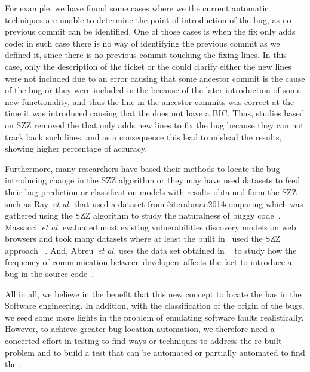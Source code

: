 \documentclass[a4paper, 12pt]{book}
\begin{document}
For example, we have found some cases where we the current automatic techniques are unable to determine the point of introduction of the bug, as no previous commit can be identified. One of those cases is when the fix only adds code: in such case there is no way of identifying the previous commit as we defined it, since there is no previous commit touching the fixing lines. In this case, only the description of the ticket or the \BFC could clarify either the new lines were not included due to an error causing that some  ancestor commit is the cause of the bug or they were included in the \BFC because of the later introduction of some new functionality, and thus the line in the ancestor commits was correct at the time it was introduced causing that the \BFC does not have a BIC. Thus, studies based on SZZ removed the \BFC that only adds new lines to fix the bug because they can not track back such lines, and as a consequence this lead to mislead the results, showing higher percentage of accuracy.

Furthermore, many researchers have based their methods to locate the bug-introducing change in the SZZ algorithm or they may have used datasets to feed their bug prediction or classification models with results obtained form the SZZ such as Ray~\emph{et al.} that used a dataset from \~cite{rahman2014comparing} which was gathered using the SZZ algorithm to study the naturalness of buggy code~\cite{ray2016naturalness}. Massacci~\emph{et al.} evaluated most existing vulnerabilities discovery models on web browsers and took many datasets where at least the built in~\cite{neuhaus2007predicting} used the SZZ approach ~\cite{massacci2014empirical}. And, Abreu~\emph{et al.} uses the data set obtained in ~\cite{sliwerski2005changes} to study how the frequency of communication between developers affects the fact to introduce a bug in the source code~\cite{abreu2009developer}.


All in all, we believe in the benefit that this new concept to locate the \FFC has in the Software engineering. In addition, with the classification of the origin of the bugs, we seed some more lights in the problem of emulating software faults realistically. However, to achieve greater bug location automation, we therefore need a concerted effort in testing to find ways or techniques to address the re-built problem and to build a test that can be automated or partially automated to find the \FFC.%
\end{document}
